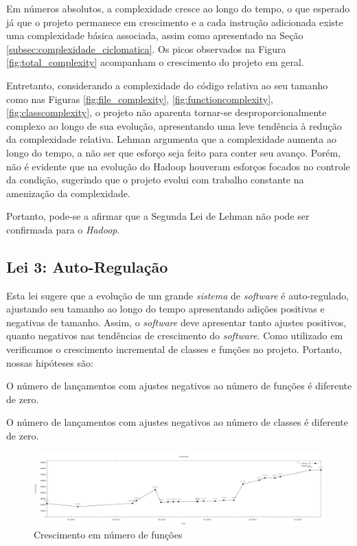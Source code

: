 Em números absolutos, a complexidade cresce ao longo do tempo, o que esperado já que o projeto permanece em crescimento e a cada instrução adicionada existe uma complexidade básica associada, assim como apresentado na Seção \ref{subsec:complexidade_ciclomatica}. Os picos observados na Figura \ref{fig:total_complexity} acompanham o crescimento do projeto em geral.

Entretanto, considerando a complexidade do código relativa ao seu tamanho como nas Figuras \ref{fig:file_complexity}, \ref{fig:functioncomplexity}, \ref{fig:classcomplexity}, o projeto não aparenta tornar-se desproporcionalmente complexo ao longo de sua evolução, apresentando uma leve tendência à redução da complexidade relativa. Lehman argumenta que a complexidade aumenta ao longo do tempo, a não ser que esforço seja feito para conter seu avanço. Porém, não é evidente que na evolução do Hadoop houveram esforços focados no controle da condição, sugerindo que o projeto evolui com trabalho constante na amenização da complexidade.

Portanto, pode-se a afirmar que a Segunda Lei de Lehman não pode ser confirmada para o \textit{Hadoop}.

\subsection{Lei 3: Auto-Regulação}
Esta lei sugere que a evolução de um grande \textit{sistema} de \textit{software} é auto-regulado, ajustando seu tamanho ao longo do tempo apresentando adições positivas e negativas de tamanho. Assim, o \textit{software} deve apresentar tanto ajustes positivos, quanto negativos nas tendências de crescimento do \textit{software}. Como utilizado em \cite{neamtiu2013towards} verificamos o crescimento incremental de classes e funções no projeto. Portanto, nossas hipóteses são:
\begin{hypothesis}
	O número de lançamentos com ajustes negativos ao número de funções é diferente de zero.
\end{hypothesis}
\begin{hypothesis}
	O número de lançamentos com ajustes negativos ao número de classes é diferente de zero.
\end{hypothesis}

\begin{figure}[h]
	\centering
	\includegraphics[width=1\linewidth]{figure/functions}
	\caption{Crescimento em número de funções}
	\label{fig:function_growth}
\end{figure}

